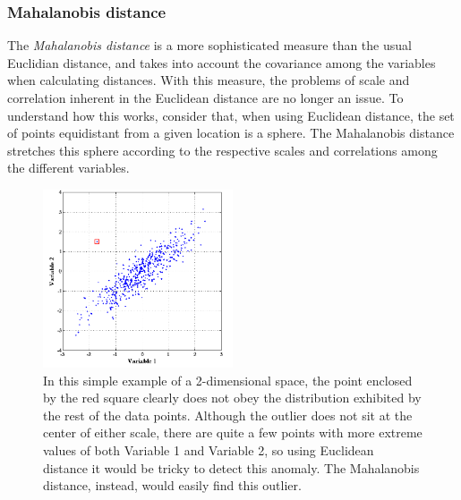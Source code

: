\documentclass[12pt,a4paper,cucitura]{toptesi}
\begin{document}

\subsubsection{Mahalanobis distance}

The \emph{Mahalanobis distance} is a more sophisticated measure than the usual Euclidian distance, and takes into account the covariance among the variables when calculating distances.
With this measure, the problems of scale and correlation inherent in the Euclidean distance are no longer an issue.
To understand how this works, consider that, when using Euclidean distance, the set of points equidistant from a given location is a sphere.
The Mahalanobis distance stretches this sphere according to the respective scales and correlations among the different variables.

\begin{figure}
\centering
\includegraphics[width=0.5\textwidth]{mahalanobis.png}
\caption[Mahalanobis distance]{In this simple example of a 2-dimensional space, the point enclosed by the red square clearly does not obey the distribution exhibited by the rest of the data points. Although the outlier does not sit at the center of either scale, there are quite a few points with more extreme values of both Variable 1 and Variable 2, so using Euclidean distance it would be tricky to detect this anomaly. The Mahalanobis distance, instead, would easily find this outlier.}
\end{figure}
\end{document}
